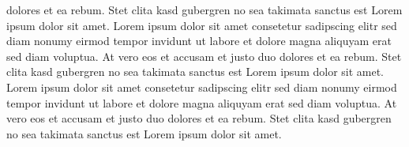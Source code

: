 {dolores et ea rebum. Stet clita kasd gubergren no sea takimata sanctus est Lorem ipsum dolor sit amet. Lorem ipsum dolor sit amet consetetur sadipscing elitr sed diam nonumy eirmod tempor invidunt ut labore et dolore magna aliquyam erat sed diam voluptua. At vero eos et accusam et justo duo dolores et ea rebum. Stet clita kasd gubergren no sea takimata sanctus est Lorem ipsum dolor sit amet. Lorem ipsum dolor sit amet consetetur sadipscing elitr sed diam nonumy eirmod tempor invidunt ut labore et dolore magna aliquyam erat sed diam voluptua. At vero eos et accusam et justo duo dolores et ea rebum. Stet clita kasd gubergren no sea takimata sanctus est Lorem ipsum dolor sit amet.
}



